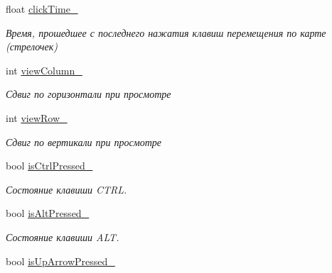 \begin{DoxyCompactItemize}
float \hyperlink{classrtm_1_1_world_scene_aa4a3b966ceb38ca3cfca6216a379a776}{click\+Time\+\_\+}
\begin{DoxyCompactList}\small\item\em Время, прошедшее с последнего нажатия клавиш перемещения по карте (стрелочек) \end{DoxyCompactList}\item 
\mbox{\label{classrtm_1_1_world_scene_a4d34d80b4473cb2e25aa8128d2b8da66}} 
int \hyperlink{classrtm_1_1_world_scene_a4d34d80b4473cb2e25aa8128d2b8da66}{view\+Column\+\_\+}
\begin{DoxyCompactList}\small\item\em Сдвиг по горизонтали при просмотре \end{DoxyCompactList}\item 
\mbox{\label{classrtm_1_1_world_scene_a158eecb6b5cf286ba0b21547a506da6c}} 
int \hyperlink{classrtm_1_1_world_scene_a158eecb6b5cf286ba0b21547a506da6c}{view\+Row\+\_\+}
\begin{DoxyCompactList}\small\item\em Сдвиг по вертикали при просмотре \end{DoxyCompactList}\item 
\mbox{\label{classrtm_1_1_world_scene_ab40433e6a3ee550adf611c3023fccf9a}} 
bool \hyperlink{classrtm_1_1_world_scene_ab40433e6a3ee550adf611c3023fccf9a}{is\+Ctrl\+Pressed\+\_\+}
\begin{DoxyCompactList}\small\item\em Состояние клавиши C\+T\+RL. \end{DoxyCompactList}\item 
\mbox{\label{classrtm_1_1_world_scene_a39b1a4e17612768e06446efd16ece59b}} 
bool \hyperlink{classrtm_1_1_world_scene_a39b1a4e17612768e06446efd16ece59b}{is\+Alt\+Pressed\+\_\+}
\begin{DoxyCompactList}\small\item\em Состояние клавиши A\+LT. \end{DoxyCompactList}\item 
\mbox{\label{classrtm_1_1_world_scene_ac323d4b7f06b591423f14934fc3791e6}} 
bool \hyperlink{classrtm_1_1_world_scene_ac323d4b7f06b591423f14934fc3791e6}{is\+Up\+Arrow\+Pressed\+\_\+}

\end{DoxyCompactItemize}
